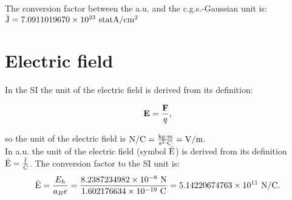 \documentclass[12pt,a4paper,twoside]{report}
\def\barf{8.2387234982\times 10^{-8}}
\def\barc{1.602176634\times 10^{-19}}
\def\bare{5.14220674763\times 10^{11}}
\def\barcurcgs{7.0911019670\times 10^{23}}
\begin{document}
{%

{\color{green} 
The conversion factor between the a.u. and the c.g.s.-Gaussian unit
is: ${\rm \bar J} = \barcurcgs\ {\rm statA}/{\rm cm}^2 $
\\

}

\newpage
{\color{coral}\section{Electric field}}
\color{black}
In the SI the unit of the electric field is derived from 
its definition:

\begin{tcolorbox}
\begin{equation}
{\bf E}={{\bf F} \over q},
\end{equation}
\end{tcolorbox}

so the unit of the electric field is ${\rm N}/{\rm C}= {{\rm kg}\cdot {\rm m} \over {\rm s}^2 \cdot {\rm C}}
={\rm V}/{\rm m}$.
\\

{\color{web-blue} In a.u. the unit of the electric field (symbol ${\rm \bar E}$) 
is derived from its definition ${\rm \bar E}={{\rm \bar f} \over {\rm \bar C}}$. The 
conversion factor to the SI unit is:
\begin{equation}
{\rm \bar E}= {E_h\over a_B e}= {\barf\ {\rm N} \over \barc\ {\rm C}}= \bare\ {\rm N}/{\rm C}. 
\end{equation}
}
\\

}
\end{document}
